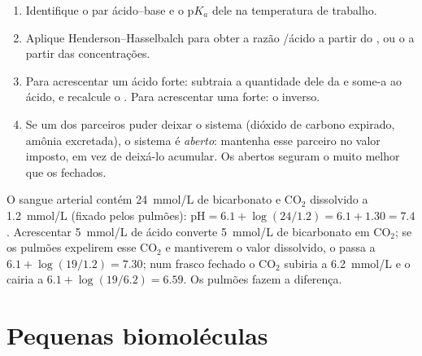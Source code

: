 \begin{method}\label{met:b1:water-small-molecules:bufferarith}
\begin{enumerate}
  \item Identifique o par ácido--base e o p$K_a$ dele na temperatura de
        trabalho.
  \item Aplique Henderson--Hasselbalch para obter a razão /ácido a
        partir do , ou o  a partir das concentrações.
  \item Para acrescentar um ácido forte: subtraia a quantidade dele da
         e some-a ao ácido, e recalcule o . Para acrescentar uma
         forte: o inverso.
  \item Se um dos parceiros puder deixar o sistema (dióxido de carbono
        expirado, amônia excretada), o sistema é \emph{aberto}: mantenha
        esse parceiro no valor imposto, em vez de deixá-lo acumular. Os
         abertos seguram o  muito melhor que os fechados.
\end{enumerate}
\end{method}

\begin{example}[O sangue]\label{ex:b1:water-small-molecules:blood}
O sangue arterial contém \qty{24}{mmol/L} de bicarbonato e
$\mathrm{CO_2}$ dissolvido a \qty{1.2}{mmol/L} (fixado pelos pulmões): $\mathrm{pH} =
6.1 + \log(24/1.2) = 6.1 + 1.30 = 7.4$. Acrescentar \qty{5}{mmol/L} de
ácido converte \qty{5}{mmol/L} de bicarbonato em $\mathrm{CO_2}$; se os
pulmões expelirem esse $\mathrm{CO_2}$ e mantiverem o valor dissolvido,
o  passa a $6.1 + \log(19/1.2) = 7.30$; num frasco fechado o
$\mathrm{CO_2}$ subiria a \qty{6.2}{mmol/L} e o  cairia a $6.1 + \log(19/6.2) =
6.59$. Os pulmões fazem a diferença.
\end{example}

\section{Pequenas biomoléculas}

